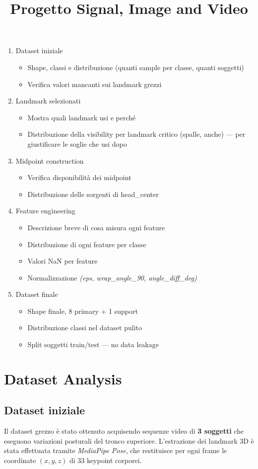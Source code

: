 \documentclass[11pt,a4paper]{article}
\title{Progetto Signal, Image and Video}
\author{}
\date{}
\begin{document}
\maketitle

\begin{enumerate}
    \item Dataset iniziale
    \begin{itemize}
        \item Shape, classi e distribuzione (quanti sample per classe, quanti soggetti)
        \item Verifica valori mancanti sui landmark grezzi
    \end{itemize}
    \item Landmark selezionati
    \begin{itemize}
        \item Mostra quali landmark usi e perché
        \item Distribuzione della visibility per landmark critico (spalle, anche) — per giustificare le soglie che usi dopo
    \end{itemize}
    \item Midpoint construction
    \begin{itemize}
        \item Verifica disponibilità dei midpoint
        \item Distribuzione delle sorgenti di head\_center
    \end{itemize}
    \item Feature engineering
    \begin{itemize}
        \item Descrizione breve di cosa misura ogni feature
        \item Distribuzione di ogni feature per classe
        \item Valori NaN per feature
        \item Normalizzazione \textit{(eps, wrap\_angle\_90, angle\_diff\_deg)}
    \end{itemize} 
    \item Dataset finale
    \begin{itemize}
        \item Shape finale, 8 primary + 1 support
        \item Distribuzione classi nel dataset pulito
        \item Split soggetti train/test — no data leakage
    \end{itemize}
\end{enumerate}

\newpage
\section{Dataset Analysis}
\subsection{Dataset iniziale}
Il dataset grezzo è stato ottenuto acquisendo sequenze video di \textbf{3 soggetti}
che eseguono variazioni posturali del tronco superiore. L'estrazione dei landmark
3D è stata effettuata tramite \textit{MediaPipe Pose}, che restituisce per ogni
frame le coordinate $(x, y, z)$ di 33 keypoint corporei.
\end{document}
